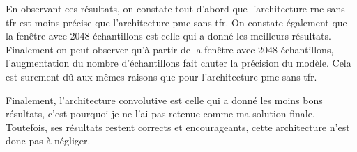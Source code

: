 En observant ces résultats, on constate tout d'abord que l'architecture \gls{rnc} sans \gls{tfr} est moins précise que l'architecture \gls{pmc} sans \gls{tfr}. On constate également que la fenêtre avec 2048 échantillons est celle qui a donné les meilleurs résultats. Finalement on peut observer qu'à partir de la fenêtre avec 2048 échantillons, l'augmentation du nombre d'échantillons fait chuter la précision du modèle. Cela est surement dû aux mêmes raisons que pour l'architecture \gls{pmc} sans \gls{tfr}.

Finalement, l'architecture convolutive est celle qui a donné les moins bons résultats, c'est pourquoi je ne l'ai pas retenue comme ma solution finale. Toutefois, ses résultats restent corrects et encourageants, cette architecture n'est donc pas à négliger.